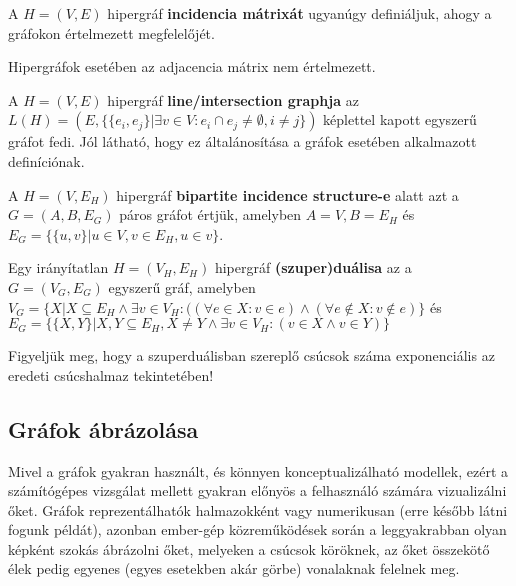 \begin{definition}
A $H=(V,E)$ hipergráf \textbf{incidencia mátrixát} ugyanúgy definiáljuk, ahogy a gráfokon értelmezett megfelelőjét.
\end{definition}

\begin{note}
Hipergráfok esetében az adjacencia mátrix nem értelmezett.
\end{note}

\begin{definition}
A $H=(V,E)$ hipergráf \textbf{line/intersection graphja} az $L(H)=(E, \{ \{ e_i, e_j \} | \exists v \in V : e_i \cap e_j \neq \emptyset, i \neq j \})$ képlettel kapott egyszerű gráfot fedi. Jól látható, hogy ez általánosítása a gráfok esetében alkalmazott definíciónak.
\end{definition}

\begin{definition}
A $H=(V,E_H)$ hipergráf \textbf{bipartite incidence structure-e} alatt azt a $G=(A,B,E_G)$ páros gráfot értjük, amelyben $A=V, B=E_H$ és $E_G=\{\{u,v\} | u \in V, v \in E_H, u \in v \}$.
\end{definition}

\begin{definition}
Egy irányítatlan $H=(V_H,E_H)$ hipergráf \textbf{(szuper)duálisa} az a $G=(V_G,E_G)$ egyszerű gráf, amelyben $V_G=\{X | X \subseteq E_H \land \exists v \in V_H : ((\forall e \in X: v \in e) \land (\forall e \notin X : v \notin e) \}$ és $E_G=\{\{X,Y\} | X,Y \subseteq E_H, X \neq Y \land \exists v \in V_H : (v \in X \land v \in Y)\}$
\end{definition}

\begin{note}
Figyeljük meg, hogy a szuperduálisban szereplő csúcsok száma exponenciális az eredeti csúcshalmaz tekintetében!
\end{note}

\subsection{Gráfok ábrázolása} \label{graphLayout}

Mivel a gráfok gyakran használt, és könnyen konceptualizálható modellek, ezért a számítógépes vizsgálat mellett gyakran előnyös a felhasználó számára vizualizálni őket. Gráfok reprezentálhatók halmazokként vagy numerikusan (erre később látni fogunk példát), azonban ember-gép közreműködések során a leggyakrabban olyan képként szokás ábrázolni őket, melyeken a csúcsok köröknek, az őket összekötő élek pedig egyenes (egyes esetekben akár görbe) vonalaknak felelnek meg.

